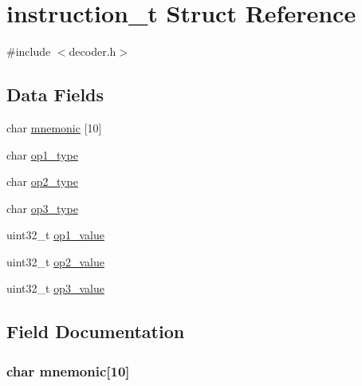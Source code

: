 \hypertarget{structinstruction__t}{}\section{instruction\+\_\+t Struct Reference}
\label{structinstruction__t}


{\ttfamily \#include $<$decoder.\+h$>$}

\subsection*{Data Fields}
\begin{DoxyCompactItemize}
\item 
char \hyperlink{structinstruction__t_a4c7b227489316ff89d9b1696bfd4a581}{mnemonic} \mbox{[}10\mbox{]}
\item 
char \hyperlink{structinstruction__t_a1cc287607a538d246fe4959fe2924e9f}{op1\+\_\+type}
\item 
char \hyperlink{structinstruction__t_a4dae1a884cb0e3a93cbc2a3cbed035d8}{op2\+\_\+type}
\item 
char \hyperlink{structinstruction__t_a456dc78cae77a4ca1f40dccc2c50230e}{op3\+\_\+type}
\item 
uint32\+\_\+t \hyperlink{structinstruction__t_a53c64a6926b4d637f4b71f07c44f2b36}{op1\+\_\+value}
\item 
uint32\+\_\+t \hyperlink{structinstruction__t_aadc9bf8dbe3cc84d8c5026fc1da8f401}{op2\+\_\+value}
\item 
uint32\+\_\+t \hyperlink{structinstruction__t_adef05908e0dd97c258edf143eab1750f}{op3\+\_\+value}
\end{DoxyCompactItemize}


\subsection{Field Documentation}
\hypertarget{structinstruction__t_a4c7b227489316ff89d9b1696bfd4a581}{}
\subsubsection[{mnemonic}]{\setlength{\rightskip}{0pt plus 5cm}char mnemonic\mbox{[}10\mbox{]}}\label{structinstruction__t_a4c7b227489316ff89d9b1696bfd4a581}
\hypertarget{structinstruction__t_a1cc287607a538d246fe4959fe2924e9f}{}
